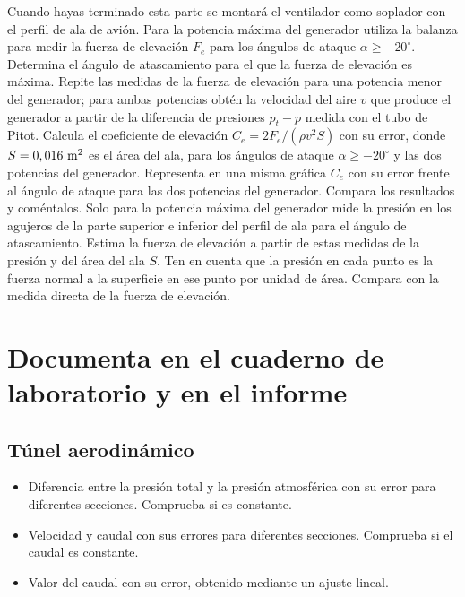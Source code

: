 \documentclass[11pt]{articulo}
\begin{document}
Cuando hayas terminado esta parte se montar\'a el ventilador como soplador con el perfil de ala de avi\'on. Para la potencia m\'axima del generador utiliza la balanza para medir la fuerza de elevaci\'on $F_e$ para los \'angulos de ataque $\alpha \ge -20^{\circ}$. Determina el \'angulo de atascamiento para el que la fuerza de elevaci\'on es m\'axima. Repite las medidas de la fuerza de elevaci\'on para una potencia menor del generador; para ambas potencias obt\'en la velocidad del aire $v$ que produce el generador a partir de la diferencia de presiones $p_t - p$ medida con el tubo de Pitot. Calcula el coeficiente de elevaci\'on $C_e = 2 F_e / (\rho v^2 S)$ con su error, donde $S = 0,016~{\rm m^2}$ es el \'area del ala, para los \'angulos de ataque $\alpha \geq -20^{\circ}$ y las dos potencias del generador. Representa en una misma gr\'afica $C_e$ con su error frente al \'angulo de ataque para las dos potencias del generador. Compara los resultados y com\'entalos. Solo para la potencia m\'axima del generador mide la presi\'on en los agujeros de la parte superior e inferior del perfil de ala para el \'angulo de atascamiento. Estima la fuerza de elevaci\'on a partir de estas medidas de la presi\'on y del \'area del ala $S$. Ten en cuenta que la presi\'on en cada punto es la fuerza normal a la superficie en ese punto por unidad de \'area. Compara con la medida directa de la fuerza de elevaci\'on.


%


\newpage
\section*{Documenta en el cuaderno de laboratorio y en el informe}

\subsection*{T\'unel aerodin\'amico}

\begin{itemize}

\item{Diferencia entre la presi\'on total y la presi\'on atmosf\'erica con su error para diferentes secciones. Comprueba si es constante.}
\item{Velocidad y caudal con sus errores para diferentes secciones. Comprueba si el caudal es constante.}
\item{Valor del caudal con su error, obtenido mediante un ajuste lineal.}

\end{itemize}
\end{document}
